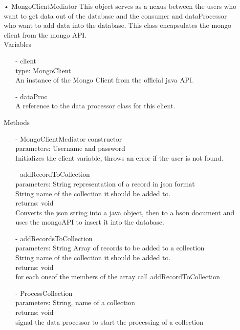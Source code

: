 \documentclass[oneside, english, final]{design}
\begin{document}
\begin{itemize}
	\item[•]MongoClientMediator
	      This object serves as a nexus between the users who want to get data out of the database and the consumer and dataProcessor who want to add data into the database. This class encapsulates the mongo client from the mongo API.
	      \\Variables
	      \begin{itemize}
		      \item[-] client
		            \\type: MongoClient
		            \\ An instance of the Mongo Client from the official java API.
		      \item[-] dataProc
		      \\ A reference to the data processor class for this client.
	      \end{itemize}
	      Methods
	      \begin{itemize}
		      \item[-]MongoClientMediator constructor
		            \\parameters: Username and password
		            \\Initializes the client variable, throws an error if the user is not found.
		      
		      \item[-]addRecordToCollection
		            \\parameters: String representation of a record in json format
		            \\String name of the collection it should be added to.
		            \\returns: void
		            \\Converts the json string into a java object, then to a bson document and uses the mongoAPI to insert it into the database.

		      \item[-]addRecordsToCollection
		            \\parameters: String Array of records to be added to a collection
		            \\String name of the collection it should be added to.
		            \\returns: void
		            \\for each oneof the members of the array call addRecordToCollection

		      \item[-]ProcessCollection 
		            \\parameters: String, name of a collection
		            \\returns: void
		            \\signal the data processor to start the processing of a collection


\end{itemize}
\end{itemize}
\end{document}
